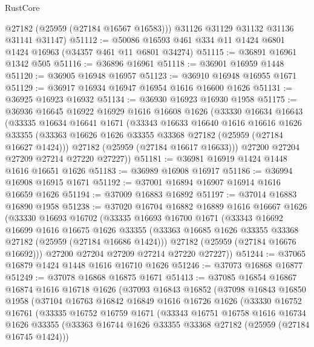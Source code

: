 \begin{lexlean}{RustCore}
\begin{coremodule}
        @27182
        (@25959 (@27184 @16567 @16583)))
      @31126
      @31129
      @31132
      @31136
      @31141
      @31147)
@51112 := @50086 @16593 @461 @334 @11 @1424 @6801 @1424 @16963 (@34357 @461 @11 @6801 @34274)
@51115 := @36891 @16961 @1342 @505
@51116 := @36896 @16961
@51118 := @36901 @16959 @1448
@51120 := @36905 @16948 @16957
@51123 := @36910 @16948 @16955 @1671
@51129 := @36917 @16934 @16947 @16954 @1616 @16600 @1626
@51131 := @36925 @16923 @16932
@51134 := @36930 @16923 @16930 @1958
@51175 := @36936
    @16645
    @16922
    @16929
    @1616
    @16608
    @1626
    (@33330
      @16634
      @16643
      (@33335
        @16634
        @16641
        @1671
        (@33343
          @16633
          @16640
          @1616
          @16616
          @1626
          @33355
          (@33363 @16626 @1626 @33355 @33368 @27182 (@25959 (@27184 @16627 @1424)))
          @27182
          (@25959 (@27184 @16617 @16633)))
        @27200
        @27204
        @27209
        @27214
        @27220
        @27227))
@51181 := @36981 @16919 @1424 @1448 @1616 @16651 @1626
@51183 := @36989 @16908 @16917
@51186 := @36994 @16908 @16915 @1671
@51192 := @37001 @16894 @16907 @16914 @1616 @16659 @1626
@51194 := @37009 @16883 @16892
@51197 := @37014 @16883 @16890 @1958
@51238 := @37020
    @16704
    @16882
    @16889
    @1616
    @16667
    @1626
    (@33330
      @16693
      @16702
      (@33335
        @16693
        @16700
        @1671
        (@33343
          @16692
          @16699
          @1616
          @16675
          @1626
          @33355
          (@33363 @16685 @1626 @33355 @33368 @27182 (@25959 (@27184 @16686 @1424)))
          @27182
          (@25959 (@27184 @16676 @16692)))
        @27200
        @27204
        @27209
        @27214
        @27220
        @27227))
@51244 := @37065 @16879 @1424 @1448 @1616 @16710 @1626
@51246 := @37073 @16868 @16877
@51249 := @37078 @16868 @16875 @1671
@51413 := @37085
    @16854
    @16867
    @16874
    @1616
    @16718
    @1626
    (@37093
      @16843
      @16852
      (@37098
        @16843
        @16850
        @1958
        (@37104
          @16763
          @16842
          @16849
          @1616
          @16726
          @1626
          (@33330
            @16752
            @16761
            (@33335
              @16752
              @16759
              @1671
              (@33343
                @16751
                @16758
                @1616
                @16734
                @1626
                @33355
                (@33363 @16744 @1626 @33355 @33368 @27182 (@25959 (@27184 @16745 @1424)))

\end{coremodule}
\end{lexlean}
